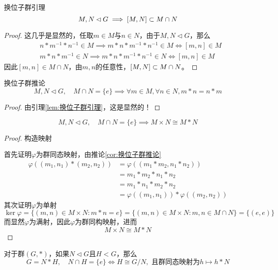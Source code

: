 \begin{lemma}{}{换位子群引理}
	$$
	M,N\lhd G\implies [M,N]\subset M\cap N
	$$
\end{lemma}

\begin{proof}
	这几乎是显然的，任取$m\in M$与$n\in N$，由于$M,N\lhd G$，那么
	\begin{align*}
		&n*m^{-1}*n^{-1}\in M\implies m*n*m^{-1}*n^{-1}\in M\iff [m,n]\in M\\
		&m*n*m^{-1}\in N\implies m*n*m^{-1}*n^{-1}\in N\iff [m,n]\in M
	\end{align*}
	因此$[m,n]\in M\cap N$，由$m,n$的任意性，$[M,N]\subset M\cap N$。
\end{proof}

\begin{corollary}{}{换位子群推论}
	$$
	M,N\lhd G, \quad M\cap N=\{e\}\implies \forall m\in M,\forall n\in N,m*n=n*m
	$$
\end{corollary}

\begin{proof}
	由引理\ref{lem:换位子群引理}，这是显然的！
\end{proof}

\begin{proposition}
	$$
	M,N\lhd G, \quad M\cap N=\{e\}\implies M\times N\cong M*N
	$$
\end{proposition}

\begin{proof}
	构造映射
	
	首先证明$\varphi$为群同态映射，由推论\ref{cor:换位子群推论}
	\begin{align*}
		\varphi((m_1,n_1)*(m_2,n_2))
		& = \varphi((m_1*m_2,n_1*n_2))\\
		& = m_1*m_2*n_1*n_2\\
		& = m_1*n_1*m_2*n_2\\
		& = \varphi((m_1,n_1))*\varphi((m_2,n_2))
	\end{align*}
	其次证明$\varphi$为单射
	$$
	\ker\varphi=\{ (m,n)\in M\times N:m*n=e \}=\{ (m,n)\in M\times N:m,n\in M\cap N \}=\{(e,e)\}
	$$
	而显然$\varphi$为满射，因此$\varphi$为群同构映射，进而
	$$
	M\times N\cong M*N
	$$
\end{proof}

\begin{proposition}
	对于群$(G,*)$，如果$N\lhd G$且$H<G$，那么
	$$
	G=N*H,\quad N\cap H=\{e\}\iff H\cong G/N,\text{ 且群同态映射为}h\mapsto h*N
	$$
\end{proposition}

